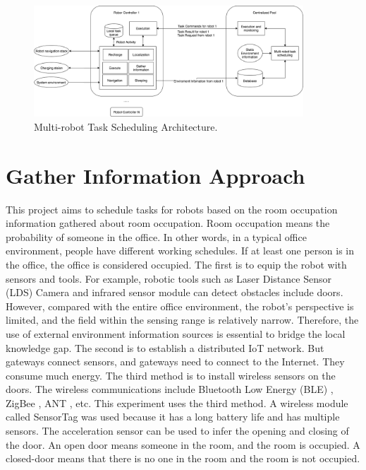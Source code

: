 \begin{figure}[htbp]
 \centering
 \includegraphics[width = 0.9\textwidth]{content/images/ch3/architecture.drawio.png}
 \caption{Multi-robot Task Scheduling Architecture.}
 \label{fig:system_architecture}
\end{figure}

\section{Gather Information Approach}
\label{sec:environment_and_gather_information_approach}

This project aims to schedule tasks for robots based on the room occupation information gathered about room occupation. Room occupation means the probability of someone in the office. In other words, in a typical office environment, people have different working schedules. If at least one person is in the office, the office is considered occupied. The first is to equip the robot with sensors and tools. For example, robotic tools such as Laser Distance Sensor (LDS) Camera and infrared sensor module can detect obstacles include doors. 
 However, compared with the entire office environment, the robot's perspective is limited, and the field within the sensing range is relatively narrow. Therefore, the use of external environment information sources is essential to bridge the local knowledge gap. The second is to establish a distributed IoT network. But gateways connect sensors, and gateways need to connect to the Internet. They consume much energy. The third method is to install wireless sensors on the doors. The wireless communications include Bluetooth Low Energy (BLE) \cite{BLEWeb}, ZigBee \cite{ZigBeeWeb}, ANT \cite{ANTWeb} , etc. This experiment uses the third method. A wireless module called SensorTag was used because it has a long battery life and has multiple sensors. The acceleration sensor can be used to infer the opening and closing of the door. An open door means someone in the room, and the room is occupied. A closed-door means that there is no one in the room and the room is not occupied. 

